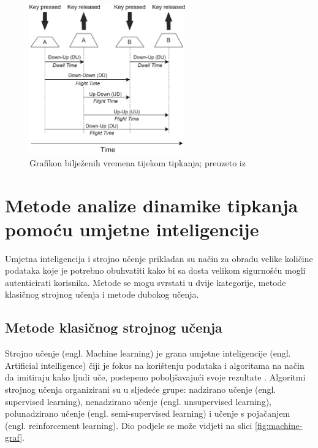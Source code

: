 \documentclass[]{foi}
\begin{document}
\begin{figure}[!h]
    \centering
    \includegraphics[width=0.6\textwidth]{slike/tipkanje-graf.jpg}
    \caption{Grafikon bilježenih vremena tijekom tipkanja; preuzeto iz \cite{Dias2023}}
    \label{fig:graf-vremena-tipkanja}
\end{figure}


\chapter{Metode analize dinamike tipkanja pomoću umjetne inteligencije}
Umjetna inteligencija i strojno učenje prikladan su način za obradu velike količine podataka koje je potrebno obuhvatiti kako bi sa dosta velikom sigurnošću mogli autenticirati korisnika. Metode se mogu svrstati u dvije kategorije, metode klasičnog strojnog učenja i metode dubokog učenja.

\section{Metode klasičnog strojnog učenja}
Strojno učenje (engl. Machine learning) je grana umjetne inteligencije (engl. Artificial intelligence) čiji je fokus na korištenju podataka i algoritama na način da imitiraju kako ljudi uče, postepeno poboljšavajući svoje rezultate \cite{ibmcom}. 
Algoritmi strojnog učenja organizirani su u sljedeće grupe: nadzirano učenje (engl. supervised learning), nenadzirano učenje (engl. unsupervised learning), polunadzirano učenje (engl. semi-supervised learning) i učenje s pojačanjem (engl. reinforcement learning). Dio podjele se može vidjeti na slici \ref{fig:machine-graf}.
\end{document}
